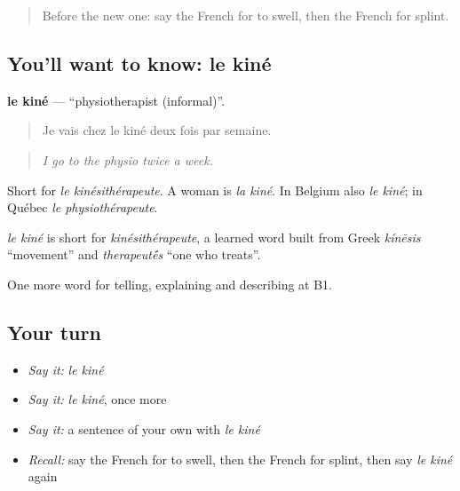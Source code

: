 \label{lesson:FR-C481-kine}



\begin{quote}
Before the new one: say the French for to swell, then the French for splint.
\end{quote}

\subsection*{You'll want to know: le kiné}
\textbf{le kiné} — \textquotedblleft{}physiotherapist (informal)\textquotedblright{}.

\begin{quote}
Je vais chez le kiné deux fois par semaine.
\end{quote}

\begin{quote}
\emph{I go to the physio twice a week.}
\end{quote}

Short for \emph{le kinésithérapeute}. A woman is \emph{la kiné}. In Belgium also \emph{le kiné}; in Québec \emph{le physiothérapeute}.

\begin{cousinweb}
\emph{le kiné} is short for \emph{kinésithérapeute}, a learned word built from Greek \emph{kínēsis} \textquotedblleft{}movement\textquotedblright{} and \emph{therapeut\'{\={e}}s} \textquotedblleft{}one who treats\textquotedblright{}.
\end{cousinweb}

\begin{grammarlens}[title={What you've built}]
One more word for telling, explaining and describing at B1.
\end{grammarlens}

\subsection*{Your turn}
\begin{itemize}
\raggedright
  \item \emph{Say it:} \emph{le kiné}
  \item \emph{Say it:} \emph{le kiné}, once more
  \item \emph{Say it:} a sentence of your own with \emph{le kiné}
  \item \emph{Recall:} say the French for to swell, then the French for splint, then say \emph{le kiné} again
\end{itemize}

